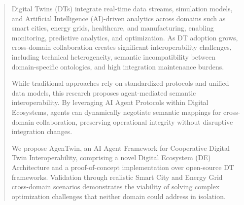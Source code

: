 
\begin{abstract}

Digital Twins (DTs) integrate real-time data streams, simulation models, and Artificial Intelligence (AI)-driven analytics across domains such as
    smart cities,
    energy grids,
    healthcare, and
    manufacturing, 
    enabling monitoring, predictive analytics, and optimization.
As DT adoption grows, cross-domain collaboration creates significant interoperability challenges, including
    technical heterogeneity,
    semantic incompatibility between domain-specific ontologies, and
    high integration maintenance burdens.

While traditional approaches rely on standardized protocols and unified data models,
    this research proposes agent-mediated semantic interoperability.
By leveraging AI Agent Protocols within Digital Ecosystems,
    agents can dynamically negotiate semantic mappings for cross-domain collaboration,
    preserving operational integrity without disruptive integration changes.

We propose AgenTwin, an AI Agent Framework for Cooperative Digital Twin Interoperability, comprising
    a novel Digital Ecosystem (DE) Architecture and
    a proof-of-concept implementation over open-source DT frameworks.
Validation through realistic Smart City and Energy Grid cross-domain scenarios demonstrates
    the viability of solving complex optimization challenges that neither domain could address in isolation.
\end{abstract}


